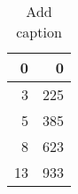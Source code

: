 \begin{table}[htbp]
  \centering
  \caption{Add caption}
    \begin{tabular}{rr}
    \toprule
    0     & 0 \\
    \midrule
    3     & 225 \\
    5     & 385 \\
    8     & 623 \\
    13    & 933 \\
    \bottomrule
    \end{tabular}%
  \label{tab:addlabel}%
\end{table}%
